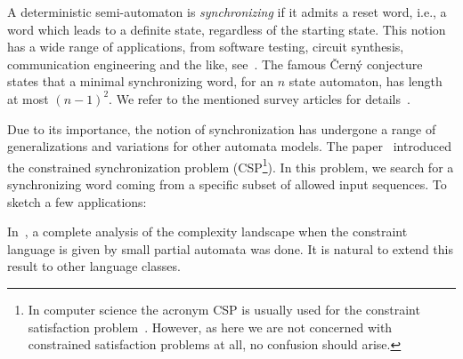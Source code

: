 
A deterministic semi-automaton is \emph{synchronizing} if it admits a reset word, i.e., a word which leads to a definite
state, regardless of the starting state. This notion has a wide range of applications, from software testing, circuit synthesis, communication engineering and the like, see~\cite{DBLP:journals/et/ChoJSP93,San2005,Vol2008}.  
The famous \v{C}ern\'y conjecture \cite{Cer64}
states that a minimal synchronizing word, for an $n$ state automaton, has length
at most $(n-1)^2$. %
We refer to the mentioned survey articles for details~\cite{San2005,Vol2008}. 



Due to its importance, the notion of synchronization has undergone a range of generalizations and variations
for other automata models.
The paper~\cite{DBLP:conf/mfcs/FernauGHHVW19} introduced the constrained synchronization problem (CSP\footnote{In computer science the
acronym CSP is usually used for the constraint satisfaction problem~\cite{Lecoutre09}. However, as here we are not concerned with
constrained satisfaction problems at all, no confusion should arise.}). 
In this problem, we search for a synchronizing word coming from a specific subset of allowed
input sequences. 
To sketch a few applications:





In~\cite{DBLP:conf/mfcs/FernauGHHVW19}, a complete analysis of the complexity landscape when the constraint language is given by small partial automata was done. It is natural to extend this result to other language classes.%


